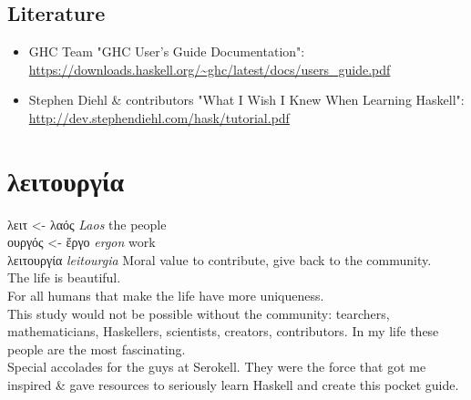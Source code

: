\documentclass[a4paper,14pt,oneside]{book}
\begin{document}
\chapter{Literature}
\label{sec:orgbfebaa6}

\begin{itemize}
\item GHC Team "GHC User’s Guide Documentation": \url{https://downloads.haskell.org/\~ghc/latest/docs/users\_guide.pdf}\\
\item Stephen Diehl \& contributors "What I Wish I Knew When Learning Haskell": \url{http://dev.stephendiehl.com/hask/tutorial.pdf}\\
\end{itemize}

\part{λειτουργία}
\label{sec:orge3284c2}

λειτ       <- λαός  \emph{Laos}       the people\\
    ουργός <- ἔργο  \emph{ergon}      work\\
λειτουργία          \emph{leitourgia} Moral value to contribute, give back to the community.\\

The life is beautiful.\\
For all humans that make the life have more uniqueness.\\

This study would not be possible without the community: tearchers, mathematicians, Haskellers, scientists, creators, contributors. In my life these people are the most fascinating.\\

Special accolades for the guys at Serokell. They were the force that got me inspired \& gave resources to seriously learn Haskell and create this pocket guide.\\
\end{document}
